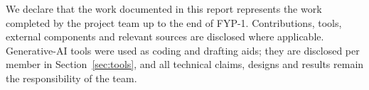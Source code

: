 We declare that the work documented in this report represents the work
completed by the project team up to the end of FYP-1. Contributions, tools,
external components and relevant sources are disclosed where applicable.
Generative-AI tools were used as coding and drafting aids; they are disclosed
per member in Section~\ref{sec:tools}, and all technical claims, designs and
results remain the responsibility of the team.
\signatureblock
